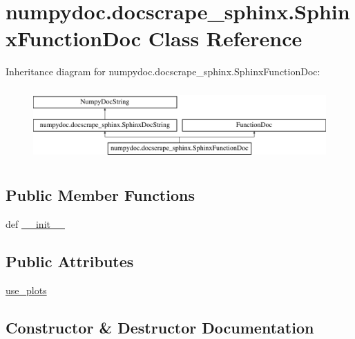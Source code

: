 \hypertarget{classnumpydoc_1_1docscrape__sphinx_1_1SphinxFunctionDoc}{}\section{numpydoc.\+docscrape\+\_\+sphinx.\+Sphinx\+Function\+Doc Class Reference}
\label{classnumpydoc_1_1docscrape__sphinx_1_1SphinxFunctionDoc}
Inheritance diagram for numpydoc.\+docscrape\+\_\+sphinx.\+Sphinx\+Function\+Doc\+:\begin{figure}[H]
\begin{center}
\leavevmode
\includegraphics[height=2.809365cm]{classnumpydoc_1_1docscrape__sphinx_1_1SphinxFunctionDoc}
\end{center}
\end{figure}
\subsection*{Public Member Functions}
\begin{DoxyCompactItemize}
\item 
def \hyperlink{classnumpydoc_1_1docscrape__sphinx_1_1SphinxFunctionDoc_a896ce4f2548e257c1c7a919f49c201df}{\+\_\+\+\_\+init\+\_\+\+\_\+}
\end{DoxyCompactItemize}
\subsection*{Public Attributes}
\begin{DoxyCompactItemize}
\item 
\hyperlink{classnumpydoc_1_1docscrape__sphinx_1_1SphinxFunctionDoc_aa3e97f30d403cd4855fd70d7d801e7c4}{use\+\_\+plots}
\end{DoxyCompactItemize}


\subsection{Constructor \& Destructor Documentation}
\hypertarget{classnumpydoc_1_1docscrape__sphinx_1_1SphinxFunctionDoc_a896ce4f2548e257c1c7a919f49c201df}{}
